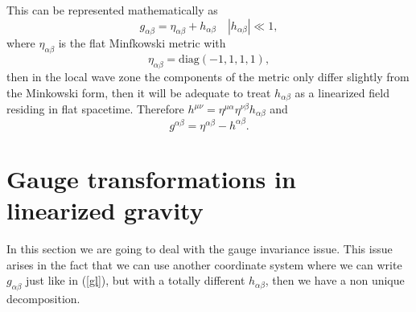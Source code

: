 This can be represented mathematically as
\begin{equation}
g_{\alpha\beta}=\eta_{\alpha\beta}+h_{\alpha\beta}\hspace{1em}\left|h_{\alpha\beta}\right|\ll1,\label{gl}
\end{equation}
where $\eta_{\alpha\beta}$ is the flat Minfkowski metric with
\[
\eta_{\alpha\beta}=\text{diag}\left(-1,1,1,1\right),
\]
then in the local wave zone the components of the metric only differ
slightly from the Minkowski form, then it will be adequate to treat
$h_{\alpha\beta}$ as a linearized field residing in flat spacetime.
Therefore $h^{\mu\nu}=\eta^{\mu\alpha}\eta^{\nu\beta}h_{\alpha\beta}$
and 
\[
g^{\alpha\beta}=\eta^{\alpha\beta}-h^{\alpha\beta}.
\]

\section{Gauge transformations in linearized gravity}

In this section we are going to deal with the gauge invariance issue.
This issue arises in the fact that we can use another coordinate system
where we can write $g_{\alpha\beta}$ just like in (\ref{gl}), but
with a totally different $h_{\alpha\beta}$, then we have a non unique
decomposition.

